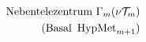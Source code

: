 \documentclass[preview]{standalone}
\begin{document}
\begin{align*}
\special{dvisvgm:raw <g id='unique000'>}\text{Nebentelezentrum }\Gamma_m(\nu\mathcal{T}_m)\\\text{(Basal }\operatorname{HypMet}_{m+1})\special{dvisvgm:raw </g>}
\end{align*}
\end{document}
